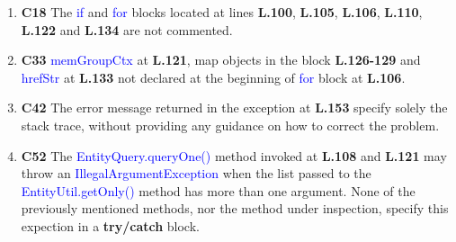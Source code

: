 \begin{enumerate}
	\item \textbf{C18} The \textcolor{blue}{if} and \textcolor{blue}{for} blocks located at lines \textbf{L.100}, \textbf{L.105}, \textbf{L.106}, \textbf{L.110}, \textbf{L.122} and \textbf{L.134} are not commented.

	\item \textbf{C33} \textcolor{blue}{memGroupCtx} at \textbf{L.121}, map objects in the block \textbf{L.126-129} and \textcolor{blue}{hrefStr} at \textbf{L.133} not declared at the beginning of \textcolor{blue}{for} block at \textbf{L.106}.

	\item \textbf{C42} The error message returned in the exception at \textbf{L.153} specify solely the stack trace, without providing any guidance on how to correct the problem.

	\item \textbf{C52} The \textcolor{blue}{EntityQuery.queryOne()} method invoked at \textbf{L.108} and \textbf{L.121} may throw an \textcolor{blue}{IllegalArgumentException} when the list passed to the \textcolor{blue}{EntityUtil.getOnly()} method has more than one argument.
None of the previously mentioned methods, nor the method under inspection, specify this expection in a \textbf{try/catch} block.
\end{enumerate}
